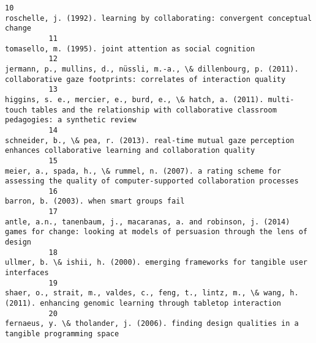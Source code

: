 \documentclass[journal,twocolumn]{IEEEtran}
\begin{document}
\begin{Verbatim}[commandchars=\\\{\}]
          10                                                                                                                                                  roschelle, j. (1992). learning by collaborating: convergent conceptual change
          11                                                                                                                                                                      tomasello, m. (1995). joint attention as social cognition
          12                                                                                            jermann, p., mullins, d., nüssli, m.-a., \& dillenbourg, p. (2011). collaborative gaze footprints: correlates of interaction quality
          13                                                                 higgins, s. e., mercier, e., burd, e., \& hatch, a. (2011). multi-touch tables and the relationship with collaborative classroom pedagogies: a synthetic review
          14                                                                                                    schneider, b., \& pea, r. (2013). real-time mutual gaze perception enhances collaborative learning and collaboration quality
          15                                                                                             meier, a., spada, h., \& rummel, n. (2007). a rating scheme for assessing the quality of computer-supported collaboration processes
          16                                                                                                                                                                                      barron, b. (2003). when smart groups fail
          17                                                                                 antle, a.n., tanenbaum, j., macaranas, a. and robinson, j. (2014) games for change: looking at models of persuasion through the lens of design
          18                                                                                                                                                ullmer, b. \& ishii, h. (2000). emerging frameworks for tangible user interfaces
          19                                                                                             shaer, o., strait, m., valdes, c., feng, t., lintz, m., \& wang, h. (2011). enhancing genomic learning through tabletop interaction
          20                                                                                                                                  fernaeus, y. \& tholander, j. (2006). finding design qualities in a tangible programming space

\end{Verbatim}
\end{document}

